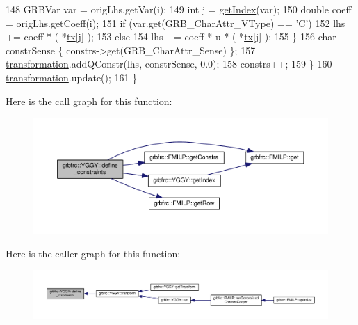 \begin{DoxyCode}
148         GRBVar var = origLhs.getVar(i);
149         \textcolor{keywordtype}{int} j = \hyperlink{classgrbfrc_1_1YGGY_ac927b33921438e06b02a766b134d2089}{getIndex}(var);
150         \textcolor{keywordtype}{double} coeff = origLhs.getCoeff(i);
151         \textcolor{keywordflow}{if} (var.get(GRB\_CharAttr\_VType) == \textcolor{charliteral}{'C'})
152             lhs += coeff * ( *\hyperlink{classgrbfrc_1_1YGGY_a1c58fb733dc53d1bf8823623aaf297f8}{tx}[j] );
153         \textcolor{keywordflow}{else}
154             lhs += coeff * u * ( *\hyperlink{classgrbfrc_1_1YGGY_a1c58fb733dc53d1bf8823623aaf297f8}{tx}[j] );
155        \}
156       \textcolor{keywordtype}{char} constrSense \{ constrs->get(GRB\_CharAttr\_Sense) \};
157       \hyperlink{classgrbfrc_1_1YGGY_a6f528d327b9dfbe474d357afe8a3d518}{transformation}.addQConstr(lhs, constrSense, 0.0);
158       constrs++;
159      \}
160     \hyperlink{classgrbfrc_1_1YGGY_a6f528d327b9dfbe474d357afe8a3d518}{transformation}.update();
161 \}
\end{DoxyCode}


Here is the call graph for this function\+:
\nopagebreak
\begin{figure}[H]
\begin{center}
\leavevmode
\includegraphics[width=350pt]{classgrbfrc_1_1YGGY_af6f49dee6ff5b2d40d1cd726065ba437_cgraph}
\end{center}
\end{figure}




Here is the caller graph for this function\+:
\nopagebreak
\begin{figure}[H]
\begin{center}
\leavevmode
\includegraphics[width=350pt]{classgrbfrc_1_1YGGY_af6f49dee6ff5b2d40d1cd726065ba437_icgraph}
\end{center}
\end{figure}


